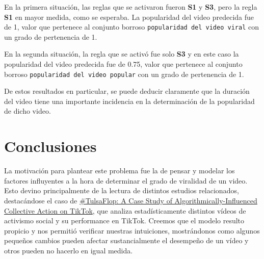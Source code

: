 \documentclass{article}
\begin{document}
En la primera situación, las reglas que se activaron fueron \textbf{S1} y \textbf{S3}, pero la regla \textbf{S1} en mayor medida, como se esperaba. La popularidad del video predecida fue de 1, valor que pertenece al conjunto borroso \verb|popularidad del video viral| con un grado de pertenencia de 1.

En la segunda situación, la regla que se activó fue solo \textbf{S3} y en este caso la popularidad del video predecida fue de 0.75, valor que pertenece al conjunto borroso \verb|popularidad del video popular| con un grado de pertenencia de 1.

De estos resultados en particular, se puede deducir claramente que la duración del video tiene una importante incidencia en la determinación de la popularidad de dicho video.


\section{Conclusiones}

La motivación para plantear este problema fue la de pensar y modelar los factores influyentes a la hora
de determinar el grado de viralidad de un video. Esto devino principalmente de la lectura de distintos estudios relacionados, destacándose el caso de \href{https://arxiv.org/abs/2012.07716}{\#TulsaFlop: A Case Study of Algorithmically-Influenced Collective Action on TikTok},
que analiza estadísticamente distintos vídeos de activismo social y su performance en TikTok.
Creemos que el modelo resulto propicio y nos permitió verificar nuestras intuiciones, mostrándonos como algunos pequeños cambios pueden afectar sustancialmente el desempeño de un vídeo
y otros pueden no hacerlo en igual medida.
\end{document}
